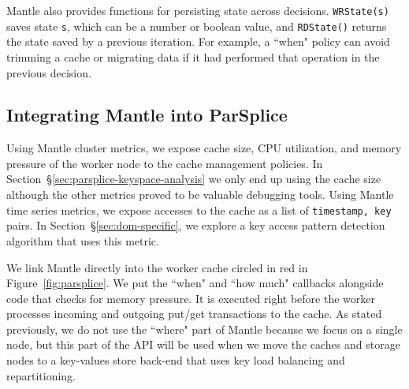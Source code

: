 Mantle also provides functions for persisting state across decisions.
\texttt{WRState(s)} saves state \texttt{s}, which can be a number or boolean
value, and \texttt{RDState()} returns the state saved by a previous iteration.
For example, a ``when" policy can avoid trimming a cache or migrating data if
it had performed that operation in the previous decision.


\subsection{Integrating Mantle into ParSplice}

Using Mantle cluster metrics, we expose cache size, CPU utilization, and memory
pressure of the worker node to the cache management policies. In
Section~\S\ref{sec:parsplice-keyspace-analysis} we only end up using the cache
size although the other metrics proved to be valuable debugging tools. Using
Mantle time series metrics, we expose accesses to the cache as a list of
\texttt{timestamp, key} pairs. In Section~\S\ref{sec:dom-specific}, we
explore a key access pattern detection algorithm that uses this metric.

We link Mantle directly into the worker cache circled in red in
Figure~\ref{fig:parsplice}. We put the ``when" and ``how much" callbacks
alongside code that checks for memory pressure. It is executed right before the
worker processes incoming and outgoing put/get transactions to the cache. As
stated previously, we do not use the ``where" part of Mantle because we focus
on a single node, but this part of the API will be used when we move the caches
and storage nodes to a key-values store back-end that uses key load balancing and
repartitioning.
